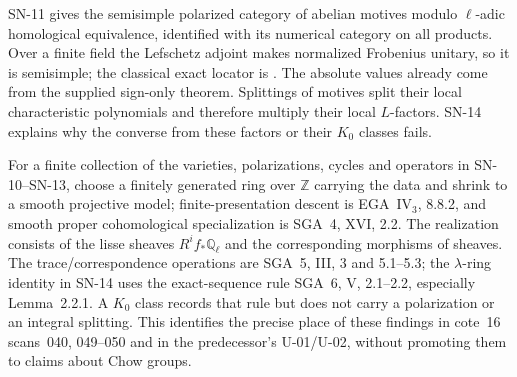 SN-11 gives the semisimple polarized category of abelian motives modulo
$\ell$-adic homological equivalence, identified with its numerical
category on all products.  Over a finite field the Lefschetz adjoint makes
normalized Frobenius unitary, so it is semisimple; the classical exact
locator is \cite[Lemma~4.6 and Theorem~4.7]{Kleiman1968}.
The absolute values already come from the supplied sign-only theorem.
Splittings of motives split their local characteristic polynomials and
therefore multiply their local $L$-factors.  SN-14 explains why the
converse from these factors or their $K_0$ classes fails.

For a finite collection of the varieties, polarizations, cycles and
operators in SN-10--SN-13, choose a finitely generated ring over
$\mathbb Z$ carrying the data and shrink to a smooth projective model;
finite-presentation descent is EGA~IV$_3$, 8.8.2, and smooth proper
cohomological specialization is SGA~4, XVI, 2.2.
The realization consists of the lisse sheaves $R^i f_*\mathbb Q_\ell$ and
the corresponding morphisms of sheaves.  The trace/correspondence
operations are SGA~5, III, 3 and 5.1--5.3; the $\lambda$-ring identity in
SN-14 uses the exact-sequence rule SGA~6, V, 2.1--2.2, especially
Lemma~2.2.1.  A $K_0$ class
records that rule but does not carry a polarization or an integral
splitting.  This identifies the precise place of these findings in
cote~16 scans~040, 049--050 and in the predecessor's U-01/U-02, without
promoting them to claims about Chow groups.
